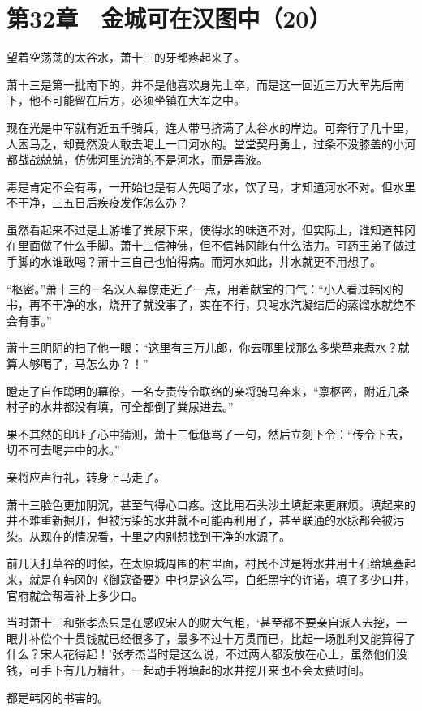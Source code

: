 \section{第32章　金城可在汉图中（20）}

望着空荡荡的太谷水，萧十三的牙都疼起来了。

萧十三是第一批南下的，并不是他喜欢身先士卒，而是这一回近三万大军先后南下，他不可能留在后方，必须坐镇在大军之中。

现在光是中军就有近五千骑兵，连人带马挤满了太谷水的岸边。可奔行了几十里，人困马乏，却竟然没人敢去喝上一口河水的。堂堂契丹勇士，过条不没膝盖的小河都战战兢兢，仿佛河里流淌的不是河水，而是毒液。

毒是肯定不会有毒，一开始也是有人先喝了水，饮了马，才知道河水不对。但水里不干净，三五日后疾疫发作怎么办？

虽然看起来不过是上游堆了粪尿下来，使得水的味道不对，但实际上，谁知道韩冈在里面做了什么手脚。萧十三信神佛，但不信韩冈能有什么法力。可药王弟子做过手脚的水谁敢喝？萧十三自己也怕得病。而河水如此，井水就更不用想了。

“枢密。”萧十三的一名汉人幕僚走近了一点，用着献宝的口气：“小人看过韩冈的书，再不干净的水，烧开了就没事了，实在不行，只喝水汽凝结后的蒸馏水就绝不会有事。”

萧十三阴阴的扫了他一眼：“这里有三万儿郎，你去哪里找那么多柴草来煮水？就算人够喝了，马怎么办？！”

瞪走了自作聪明的幕僚，一名专责传令联络的亲将骑马奔来，“禀枢密，附近几条村子的水井都没有填，可全都倒了粪尿进去。”

果不其然的印证了心中猜测，萧十三低低骂了一句，然后立刻下令：“传令下去，切不可去喝井中的水。”

亲将应声行礼，转身上马走了。

萧十三脸色更加阴沉，甚至气得心口疼。这比用石头沙土填起来更麻烦。填起来的井不难重新掘开，但被污染的水井就不可能再利用了，甚至联通的水脉都会被污染。从现在的情况看，十里之内别想找到干净的水源了。

前几天打草谷的时候，在太原城周围的村里面，村民不过是将水井用土石给填塞起来，就是在韩冈的《御寇备要》中也是这么写，白纸黑字的许诺，填了多少口井，官府就会帮着补上多少口。

当时萧十三和张孝杰只是在感叹宋人的财大气粗，‘甚至都不要亲自派人去挖，一眼井补偿个十贯钱就已经很多了，最多不过十万贯而已，比起一场胜利又能算得了什么？宋人花得起！’张孝杰当时是这么说，不过两人都没放在心上，虽然他们没钱，可手下有几万精壮，一起动手将填起的水井挖开来也不会太费时间。

都是韩冈的书害的。

